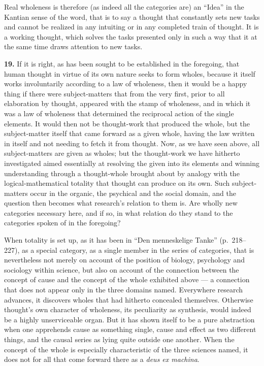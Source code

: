 \documentclass[12pt]{book}
\newcommand{\hnum}[1]{\textbf{#1.}\enspace}
\newcommand{\opage}[1]{\marginnote{\footnotesize\textit{[#1]}}}
\begin{document}
Real wholeness is therefore (as indeed all the categories are) an ``Idea'' in the
Kantian sense of the word, that is to say a thought that constantly sets new tasks
and cannot be realized in any intuiting or in any completed train of thought. It is
a working thought, which solves the tasks presented only in such a way that it at
the same time draws attention to new tasks.

\hnum{19} If it is right, as has been sought to be established in the foregoing,
that human thought in virtue of its own nature seeks to form wholes, because it
itself works involuntarily according to a law of wholeness, then it would be a
happy thing if there were subject-matters that from the very first, prior to all
elaboration by thought, appeared with the stamp of wholeness, and in which it was a
law of wholeness that determined the reciprocal action of the single elements. It
would then not be thought-work that produced the whole, but the subject-matter
itself that came forward as a given whole, having the law written in itself and not
needing to fetch it from thought. Now, as we have seen above, all subject-matters
are given as wholes; but the thought-work we have hitherto investigated aimed
essentially at resolving the given into its elements and winning understanding
through a thought-whole brought about by analogy with the logical-mathematical
totality that thought can produce on its own. Such subject-matters occur in the
organic, the psychical and the social domain, and the question then becomes what
research's relation to them is. Are wholly new categories necessary here, and if so,
in what relation do they stand to the categories spoken of in the foregoing?

\opage{51}When totality is set up, as it has been in ``Den menneskelige Tanke'' (p.\ 218--227),
as a special category, as a single member in the series of categories, that is
nevertheless not merely on account of the position of biology, psychology and
sociology within science, but also on account of the connection between the concept
of cause and the concept of the whole exhibited above --- a connection that does not
appear only in the three domains named. Everywhere research advances, it discovers
wholes that had hitherto concealed themselves. Otherwise thought's own character of
wholeness, its peculiarity as synthesis, would indeed be a highly unserviceable
organ. But it has shown itself to be a pure abstraction when one apprehends cause as
something single, cause and effect as two different things, and the causal series as
lying quite outside one another. When the concept of the whole is especially
characteristic of the three sciences named, it does not for all that come forward
there as a \textit{deus ex machina}.
\end{document}
